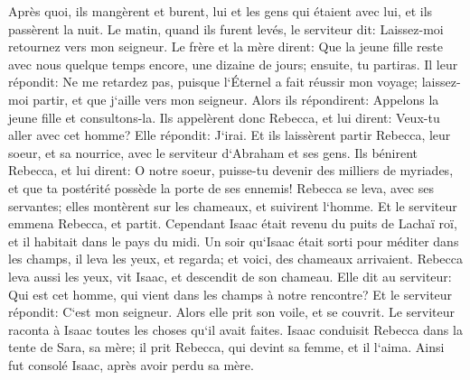 \verse Après quoi, ils mangèrent et burent, lui et les gens qui étaient avec lui, et ils passèrent la nuit. Le matin, quand ils furent levés, le serviteur dit: Laissez-moi retournez vers mon seigneur. 
\verse Le frère et la mère dirent: Que la jeune fille reste avec nous quelque temps encore, une dizaine de jours; ensuite, tu partiras. 
\verse Il leur répondit: Ne me retardez pas, puisque l`Éternel a fait réussir mon voyage; laissez-moi partir, et que j`aille vers mon seigneur. 
\verse Alors ils répondirent: Appelons la jeune fille et consultons-la. 
\verse Ils appelèrent donc Rebecca, et lui dirent: Veux-tu aller avec cet homme? Elle répondit: J`irai. 
\verse Et ils laissèrent partir Rebecca, leur soeur, et sa nourrice, avec le serviteur d`Abraham et ses gens. 
\verse Ils bénirent Rebecca, et lui dirent: O notre soeur, puisse-tu devenir des milliers de myriades, et que ta postérité possède la porte de ses ennemis! 
\verse Rebecca se leva, avec ses servantes; elles montèrent sur les chameaux, et suivirent l`homme. Et le serviteur emmena Rebecca, et partit. 
\verse Cependant Isaac était revenu du puits de Lachaï roï, et il habitait dans le pays du midi. 
\verse Un soir qu`Isaac était sorti pour méditer dans les champs, il leva les yeux, et regarda; et voici, des chameaux arrivaient. 
\verse Rebecca leva aussi les yeux, vit Isaac, et descendit de son chameau. 
\verse Elle dit au serviteur: Qui est cet homme, qui vient dans les champs à notre rencontre? Et le serviteur répondit: C`est mon seigneur. Alors elle prit son voile, et se couvrit. 
\verse Le serviteur raconta à Isaac toutes les choses qu`il avait faites. 
\verse Isaac conduisit Rebecca dans la tente de Sara, sa mère; il prit Rebecca, qui devint sa femme, et il l`aima. Ainsi fut consolé Isaac, après avoir perdu sa mère. 

